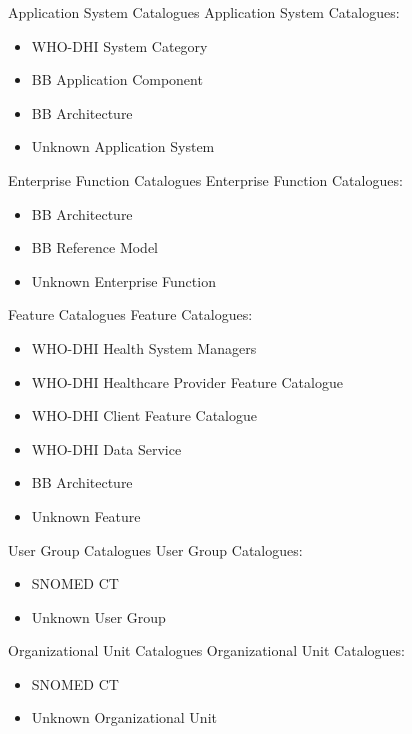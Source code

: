 \documentclass[aspectratio=1610,12pt]{beamer}
\begin{document}
\begin{frame}{Application System Catalogues}
  Application System Catalogues:
  \begin{itemize}
    \item WHO-DHI System Category
    \item BB Application Component
    \item BB Architecture
    \item Unknown Application System
  \end{itemize}
\end{frame}

\begin{frame}{Enterprise Function Catalogues}
  Enterprise Function Catalogues:
  \begin{itemize}
    \item BB Architecture
    \item BB Reference Model
    \item Unknown Enterprise Function
  \end{itemize}
\end{frame}

\begin{frame}{Feature Catalogues}
  Feature Catalogues:
  \begin{itemize}
    \item WHO-DHI Health System Managers
    \item WHO-DHI Healthcare Provider Feature Catalogue
    \item WHO-DHI Client Feature Catalogue
    \item WHO-DHI Data Service
    \item BB Architecture
    \item Unknown Feature
  \end{itemize}
\end{frame}

\begin{frame}{User Group Catalogues}
  User Group Catalogues:
  \begin{itemize}
    \item SNOMED CT
    \item Unknown User Group
  \end{itemize}
\end{frame}

\begin{frame}{Organizational Unit Catalogues}
  Organizational Unit Catalogues:
  \begin{itemize}
    \item SNOMED CT
    \item Unknown Organizational Unit
  \end{itemize}
\end{frame}
\end{document}
